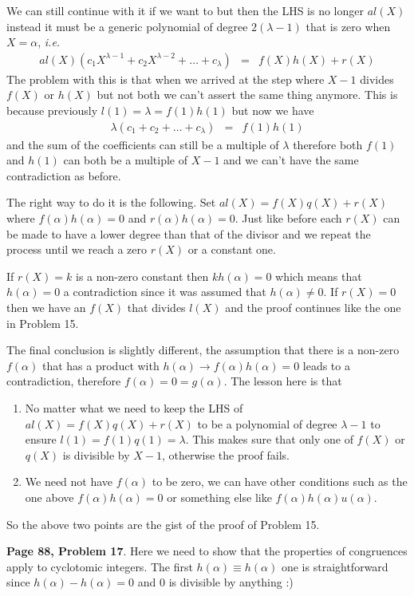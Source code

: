 \documentclass[aps,preprint,preprintnumbers,nofootinbib,showpacs,prd]{revtex4-1}
\newcommand{\ie}{{\it i.e.} }
\newcommand{\nbea}{\begin{eqnarray*}}
\newcommand{\neea}{\end{eqnarray*}}
\begin{document}
We can still continue with it if we want to but then the LHS is no longer $al(X)$ instead it must be a generic polynomial of degree $2(\lambda-1)$ that is zero when $X = \alpha$, \ie
%
\nbea
al(X)(c_1 X^{\lambda - 1} + c_2 X^{\lambda - 2} + \dots + c_\lambda) & = & f(X)h(X) + r(X)
\neea
%
The problem with this is that when we arrived at the step where $X - 1$ divides $f(X)$ or $h(X)$ but not both we can't assert the same thing anymore. This is because previously $l(1) = \lambda = f(1)h(1)$ but now we have 
%
\nbea
\lambda(c_1 + c_2 + \dots + c_\lambda) & = & f(1)h(1)
\neea
%
and the sum of the coefficients can still be a multiple of $\lambda$ therefore both $f(1)$ and $h(1)$ can both be a multiple of $X - 1$ and we can't have the same contradiction as before.

The right way to do it is the following. Set $al(X) = f(X)q(X) + r(X)$ where $f(\alpha)h(\alpha) = 0$ and $r(\alpha)h(\alpha) = 0$. Just like before each $r(X)$ can be made to have a lower degree than that of the divisor and we repeat the process until we reach a zero $r(X)$ or a constant one.

If $r(X) = k$ is a non-zero constant then $k h(\alpha) = 0$ which means that $h(\alpha) = 0$ a contradiction since it was assumed that $h(\alpha) \neq 0$. If $r(X) = 0$ then we have an $f(X)$ that divides $l(X)$ and the proof continues like the one in Problem 15.

The final conclusion is slightly different, the assumption that there is a non-zero $f(\alpha)$ that has a product with $h(\alpha) \to f(\alpha)h(\alpha) = 0$ leads to a contradiction, therefore $f(\alpha) = 0 = g(\alpha)$. The lesson here is that 
%
\begin{enumerate}
%
\item No matter what we need to keep the LHS of $a l(X) = f(X)q(X) + r(X)$ to be a polynomial of degree $\lambda - 1$ to ensure $l(1) = f(1)q(1) = \lambda$. This makes sure that only one of $f(X)$ or $q(X)$ is divisible by $X-1$, otherwise the proof fails.
%
\item We need not have $f(\alpha)$ to be zero, we can have other conditions such as the one above $f(\alpha)h(\alpha) = 0$ or something else like $f(\alpha)h(\alpha)u(\alpha)$.
\end{enumerate}
%
So the above two points are the gist of the proof of Problem 15.

{\bf Page 88, Problem 17}. Here we need to show that the properties of congruences apply to cyclotomic integers. The first $h(\alpha) \equiv h(\alpha)$ one is straightforward since $h(\alpha) - h(\alpha) = 0$ and 0 is divisible by anything :)
\end{document}
